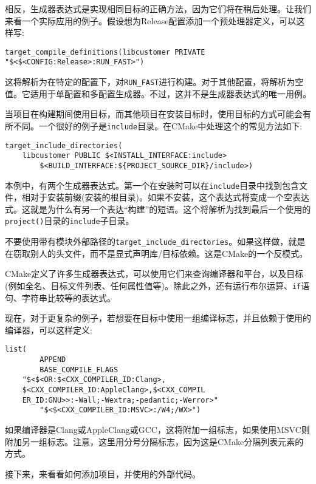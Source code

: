 相反，生成器表达式是实现相同目标的正确方法，因为它们将在稍后处理。让我们来看一个实际应用的例子。假设想为Release配置添加一个预处理器定义，可以这样写:

\begin{lstlisting}[style=styleCMake]
target_compile_definitions(libcustomer PRIVATE
"$<$<CONFIG:Release>:RUN_FAST>")
\end{lstlisting}

这将解析为在特定的配置下，对\texttt{RUN\_FAST}进行构建。对于其他配置，将解析为空值。它适用于单配置和多配置生成器。不过，这并不是生成器表达式的唯一用例。

当项目在构建期间使用目标，而其他项目在安装目标时，使用目标的方式可能会有所不同。一个很好的例子是\texttt{include}目录。在CMake中处理这个的常见方法如下:

\begin{lstlisting}[style=styleCMake]
target_include_directories(
	libcustomer PUBLIC $<INSTALL_INTERFACE:include>
		$<BUILD_INTERFACE:${PROJECT_SOURCE_DIR}/include>)
\end{lstlisting}

本例中，有两个生成器表达式。第一个在安装时可以在\texttt{include}目录中找到包含文件，相对于安装前缀(安装的根目录)。如果不安装，这个表达式将变成一个空表达式。这就是为什么有另一个表达“构建”的短语。这个将解析为找到最后一个使用的\texttt{project()}目录的\texttt{include}子目录。

\begin{tcolorbox}[colback=blue!5!white,colframe=blue!75!black, title=Note]
\hspace*{0.7cm}不要使用带有模块外部路径的\texttt{target\_include\_directories}。如果这样做，就是在窃取别人的头文件，而不是显式声明库/目标依赖。这是CMake的一个反模式。
\end{tcolorbox}

CMake定义了许多生成器表达式，可以使用它们来查询编译器和平台，以及目标(例如全名、目标文件列表、任何属性值等)。除此之外，还有运行布尔运算、\texttt{if}语句、字符串比较等的表达式。

现在，对于更复杂的例子，若想要在目标中使用一组编译标志，并且依赖于使用的编译器，可以这样定义:

\begin{lstlisting}[style=styleCMake]
list(
		APPEND
		BASE_COMPILE_FLAGS
	"$<$<OR:$<CXX_COMPILER_ID:Clang>,
	$<CXX_COMPILER_ID:AppleClang>,$<CXX_COMPIL
	ER_ID:GNU>>:-Wall;-Wextra;-pedantic;-Werror>"
		"$<$<CXX_COMPILER_ID:MSVC>:/W4;/WX>")
\end{lstlisting}

如果编译器是Clang或AppleClang或GCC，这将附加一组标志，如果使用MSVC则附加另一组标志。注意，这里用分号分隔标志，因为这是CMake分隔列表元素的方式。

接下来，来看看如何添加项目，并使用的外部代码。








